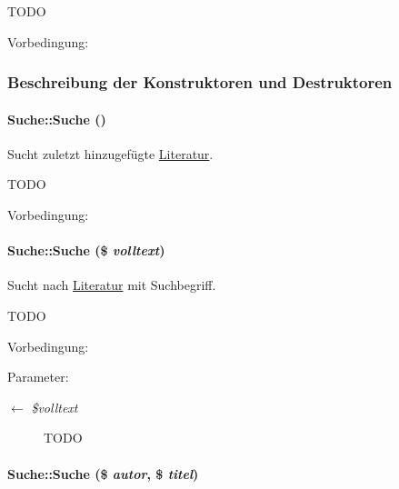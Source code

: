 TODO \begin{Desc}
\item[Vorbedingung:]\end{Desc}




\subsubsection{Beschreibung der Konstruktoren und Destruktoren}
\hypertarget{classSuche_e863aff1c9abcb0308d5d3fdcdebb968}{
\paragraph[Suche]{\setlength{\rightskip}{0pt plus 5cm}Suche::Suche ()}\hfill}
\label{classSuche_e863aff1c9abcb0308d5d3fdcdebb968}


Sucht zuletzt hinzugefügte \hyperlink{classLiteratur}{Literatur}. 

TODO \begin{Desc}
\item[Vorbedingung:]\end{Desc}
\hypertarget{classSuche_05639fec18bd3193c01aafb08208ec94}{
\paragraph[Suche]{\setlength{\rightskip}{0pt plus 5cm}Suche::Suche (\$ {\em volltext})}\hfill}
\label{classSuche_05639fec18bd3193c01aafb08208ec94}


Sucht nach \hyperlink{classLiteratur}{Literatur} mit Suchbegriff. 

TODO \begin{Desc}
\item[Vorbedingung:]\end{Desc}
\begin{Desc}
\item[Parameter:]
\begin{description}
\item[\mbox{$\leftarrow$} {\em \$volltext}]TODO \end{description}
\end{Desc}
\hypertarget{classSuche_4158769424a462492ac7821a0a30cf08}{
\paragraph[Suche]{\setlength{\rightskip}{0pt plus 5cm}Suche::Suche (\$ {\em autor}, \$ {\em titel})}\hfill}
\label{classSuche_4158769424a462492ac7821a0a30cf08}


